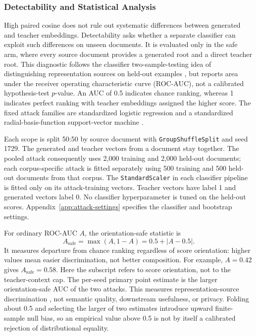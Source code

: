 \documentclass[10pt]{article}
\begin{document}
\subsubsection{Detectability and Statistical Analysis}
\label{sec:detectability}

High paired cosine does not rule out systematic differences between generated
and teacher embeddings. Detectability asks whether a separate classifier can
exploit such differences on unseen documents. It is evaluated only in the safe
arm, where every source document provides a generated root and a direct teacher
root. This diagnostic follows the classifier two-sample-testing idea of
distinguishing representation sources on held-out examples
\citep{lopez-paz-oquab-2016-classifier}, but reports area under the receiver
operating characteristic curve (ROC-AUC), not a calibrated hypothesis-test
\(p\)-value. An AUC of 0.5 indicates chance ranking, whereas 1 indicates perfect
ranking with teacher embeddings assigned the higher score. The fixed attack
families are standardized logistic regression \citep{cox-1958-binary-regression}
and a standardized radial-basis-function support-vector machine
\citep{cortes-vapnik-1995-support-vector}.

Each scope is split 50:50 by source document with
\texttt{GroupShuffleSplit} and seed 1729. The generated and teacher vectors
from a document stay together. The pooled attack consequently uses 2,000
training and 2,000 held-out documents; each corpus-specific attack is fitted
separately using 500 training and 500 held-out documents from that corpus.
The \texttt{StandardScaler} in each classifier pipeline is fitted only on its
attack-training vectors. Teacher vectors have label 1 and generated vectors
label 0. No classifier hyperparameter is tuned on the held-out scores.
Appendix~\ref{app:attack-settings} specifies the classifier and bootstrap settings.

For ordinary ROC-AUC \(A\), the orientation-safe statistic is
\[
 A_{\mathrm{safe}}=\max(A,1-A)=0.5+\lvert A-0.5\rvert.
\]
It measures departure from chance ranking regardless of score orientation:
higher values mean easier discrimination, not better composition. For example,
\(A=0.42\) gives \(A_{\mathrm{safe}}=0.58\). Here the subscript refers to score
orientation, not to the teacher-context cap. The per-seed primary
point estimate is the larger orientation-safe AUC of the two attacks. This
measures representation-source discrimination \citep{hanley-mcneil-1982-auc},
not semantic quality, downstream usefulness, or privacy. Folding about 0.5 and
selecting the larger of two estimates introduce upward finite-sample null
bias, so an empirical value above 0.5 is not by itself a calibrated rejection
of distributional equality.
\end{document}
